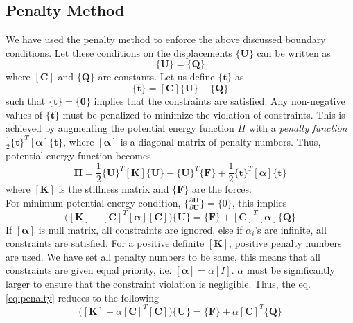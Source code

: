 \documentclass[openright,twoside]{iitkthesis}
\newcommand{\e}[1]{\textbf{#1}}
\begin{document}
\subsection{Penalty Method}
\label{sec:pbc}
We have used the penalty method to enforce the above discussed boundary conditions. Let these conditions on the displacements $\{\e U\}$ can be written as
\begin{equation*}
[\textbf{C}]\{\textbf{U}\} = \{\textbf{Q}\}
\end{equation*}
where $[\textbf{C}]$ and $\{\textbf{Q}\}$ are constants. Let us define $\{\textbf{t}\}$ as
\begin{equation*}
\{\textbf{t}\} = [\textbf{C}]\{\textbf{U}\} - \{\textbf{Q}\}
\end{equation*}
such that $\{\textbf{t}\} = \{\textbf{0}\}$ implies that the constraints are satisfied. Any non-negative values of $\{\textbf{t}\}$ must be penalized to minimize the violation of constraints. This is achieved by augmenting the potential energy function\cite{Book:Cook} $\Pi$ with a \textit{penalty function} $\frac{1}{2}\{\textbf{t}\}^T[\bm\alpha]\{\textbf{t}\}$, where $[\bm\alpha]$ is a diagonal matrix of penalty numbers. Thus, potential energy function becomes
\begin{equation}
\bm\Pi = \frac{1}{2}\{\e U\}^T[\e K]\{\e U\} - \{\e U\}^T\{\e F\} + \frac{1}{2}\{\textbf{t}\}^T[\bm\alpha]\{\textbf{t}\}
\end{equation}
where $[\e K]$ is the stiffness matrix and $\{\e F\}$ are the forces.\\
For minimum potential energy condition, $\{\frac{\partial\bm\Pi}{\partial\e U}\} = \{0\}$, this implies
\begin{equation}
\label{eq:penalty}
\bigg([\e K]+[\e C]^T[\bm\alpha][\e C]\bigg)\{\e U\} = \{\e F\} + [\e C]^T[\bm\alpha]\{\e Q\}
\end{equation}
If $[\bm\alpha]$ is null matrix, all constraints are ignored, else if $\alpha_i$'s are infinite, all constraints are satisfied. For a positive definite $[\e K]$, positive penalty numbers are used. We have set all penalty numbers to be same, this means that all constraints are given equal priority, i.e. $[\bm\alpha] = \alpha[I]$. $\alpha$ must be significantly larger to ensure that the constraint violation is negligible. Thus, the eq. \eqref{eq:penalty} reduces to the following
\begin{equation}
\label{eq:penalty1}
\bigg([\e K]+\alpha[\e C]^T[\e C]\bigg)\{\e U\} = \{\e F\} + \alpha[\e C]^T\{\e Q\}
\end{equation}
\end{document}
